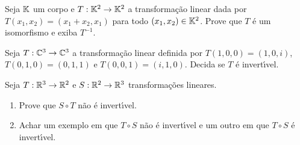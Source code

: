\documentclass[12pt]{exam}
\begin{document}
\begin{exercicio}
	Seja $\mathbb{K}$ um corpo e $T : \mathbb{K}^2 \to \mathbb{K}^2$ a transforma\c{c}\~ao linear dada por $T(x_1,x_2) = (x_1 + x_2, x_1)$ para todo $(x_1,x_2) \in \mathbb{K}^2$. Prove que $T$ \'e um isomorfismo e exiba $T^{-1}$.
\end{exercicio}

\begin{exercicio}
	Seja $T : \mathbb{C}^3 \to \mathbb{C}^3$ a transforma\c{c}\~ao linear definida por $T(1,0,0) = (1,0,i)$, $T(0,1,0) = (0,1,1)$ e $T(0,0,1) = (i,1,0)$. Decida se $T$ \'e invert{\'\i}vel.
\end{exercicio}

\begin{exercicio}
	Seja $T : \mathbb{R}^3 \to \mathbb{R}^2$ e $S : \mathbb{R}^2 \to \mathbb{R}^3$ transforma\c{c}\~oes lineares.
	\begin{enumerate}[label=({\alph*})]
		\item Prove que $S \circ T$ n\~ao \'e invert{\'\i}vel.
		\item Achar um exemplo em que $T\circ S$ n\~ao \'e invert{\'\i}vel e um outro em que $T\circ S$ \'e invert{\'\i}vel.
	\end{enumerate}
\end{exercicio}


\end{document}
